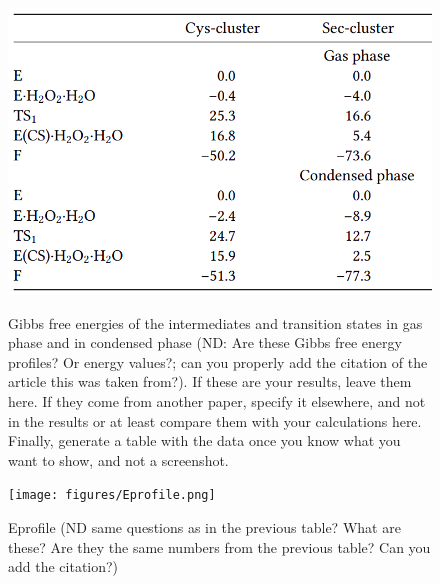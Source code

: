 \documentclass[journal=jacsat,manuscript=article]{achemso}
\begin{document}
 \begin{figure}
  \caption{Gibbs free energies of the intermediates and transition states in gas phase and in condensed phase (ND: Are these Gibbs free energy profiles? Or energy values?; can you properly add the citation of the article this was taken from?). If these are your results, leave them here. If they come from another paper, specify it elsewhere, and not in the results or at least compare them with your calculations here. Finally, generate a table with the data once you know what you want to show, and not a screenshot.}
   \label{fgr:etable}
   \includegraphics[width=\linewidth]{figures/Etable.png} 
 \label{fig:etable}
 \end{figure}

 \begin{figure}
  \caption{Eprofile (ND same questions as in the previous table? What are these? Are they the same numbers from the previous table? Can you add the citation?) }
   \label{fgr:eprofile}
   \texttt{[image: figures/Eprofile.png]} 
 \label{fig:eprofile}
 \end{figure}
\end{document}
